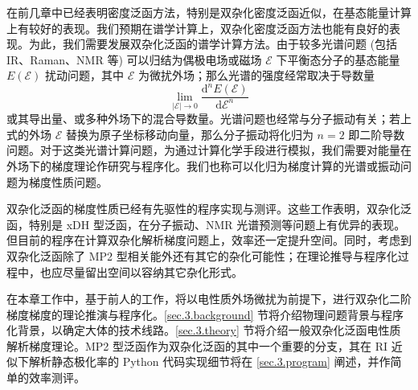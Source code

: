 在前几章中已经表明密度泛函方法，特别是双杂化密度泛函近似，在基态能量计算上有较好的表现。我们预期在谱学计算上，双杂化密度泛函方法也能有良好的表现。为此，我们需要发展双杂化泛函的谱学计算方法。由于较多光谱问题 (包括 IR、Raman、NMR 等) 可以归结为偶极电场或磁场 $\pmb{\mathcal{E}}$ 下平衡态分子的基态能量 $E(\pmb{\mathcal{E}})$ 扰动问题，其中 $\pmb{\mathcal{E}}$ 为微扰外场；那么光谱的强度经常取决于导数量
\begin{equation}
  \lim_{|\pmb{\mathcal{E}}| \rightarrow 0} \frac{\mathrm{d}^n E(\pmb{\mathcal{E}})}{\mathrm{d} \pmb{\mathcal{E}}^n}
\end{equation}
或其导出量、或多种外场下的混合导数量。光谱问题也经常与分子振动有关；若上式的外场 $\pmb{\mathcal{E}}$ 替换为原子坐标移动向量，那么分子振动将化归为 $n = 2$ 即二阶导数问题。对于这类光谱计算问题，为通过计算化学手段进行模拟，我们需要对能量在外场下的梯度理论作研究与程序化。我们也称可以化归为梯度计算的光谱或振动问题为\textsf{梯度性质}问题。

双杂化泛函的梯度性质已经有先驱性的程序实现与测评\cite{Neese-Grimme.JCP.2007, Biczysko-Barone.JCTC.2010, Su-Xu.JCC.2013, Stoychev-Neese.JCTC.2018, Gu-Xu.JCTC.2021, Yan-Xu.JCTC.2022}。这些工作表明，双杂化泛函，特别是 xDH 型泛函，在分子振动、NMR 光谱预测等问题上有优异的表现。但目前的程序在计算双杂化解析梯度问题上，效率还一定提升空间。同时，考虑到双杂化泛函除了 MP2 型相关能外还有其它的杂化可能性；在理论推导与程序化过程中，也应尽量留出空间以容纳其它杂化形式。

在本章工作中，基于前人的工作\cite{Gerratt-Mills.JCP.1968, Gerratt-Mills.JCP.1968a, Pople-Binkley.IJQC.1979, Dykstra-Jasien.CPL.1984, Handy-Schaefer.JCP.1984, Handy-Simandiras.CPL.1985, Pulay-Saeboe.TCA.1986, Trucks-Bartlett.CPL.1988, Frisch-Pople.CP.1990, Frisch-Pople.CPL.1990, Frisch-Pople.CPL.1990a, Gauss-Bartlett.JCP.1992, Stanton-Bartlett.CPL.1992, Johnson-Frisch.CPL.1993, Head-Gordon-Head-Gordon.CPL.1994, Yamaguchi-Schaefer.Oxford.1994, Weigend-Haeser.TCA.1997, Aikens-Gordon.TCA.2003, Cammi-Frisch.TCA.2004, Distasio-Head-Gordon.JCC.2007, Neese-Grimme.JCP.2007, Biczysko-Barone.JCTC.2010, Su-Xu.JCC.2013, Ji-Jung.JCTC.2013, Bykov-Neese.MP.2015, Stoychev-Neese.JCTC.2018, Gu-Xu.JCTC.2021, Yan-Xu.JCTC.2022}，将以电性质外场微扰为前提下，进行双杂化二阶梯度梯度的理论推演与程序化。\ref{sec.3.background} 节将介绍物理问题背景与程序化背景，以确定大体的技术线路。\ref{sec.3.theory} 节将介绍一般双杂化泛函电性质解析梯度理论。MP2 型泛函作为双杂化泛函的其中一个重要的分支，其在 RI 近似下解析静态极化率的 Python 代码实现细节将在 \ref{sec.3.program} 阐述，并作简单的效率测评。

